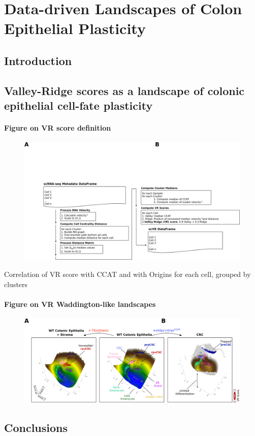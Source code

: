 \chapter{Data-driven Landscapes of Colon Epithelial Plasticity}
\label{05vr}

\section{Introduction}

\section{Valley-Ridge scores as a landscape of colonic epithelial cell-fate plasticity}

\subsubsection{Figure on VR score definition}

\begin{figure}
    \centering
    \includegraphics{05vr/figs/5VR_Score.png}
    \caption{}
    \label{fig:}
\end{figure}

Correlation of VR score with CCAT and with Origins for each cell, grouped by clusters

\subsubsection{Figure on VR Waddington-like landscapes}

\begin{figure}
    \centering
    \includegraphics{05vr/figs/5VR_Landscape.png}
    \caption{}
    \label{fig:}
\end{figure}

\section{Conclusions}





